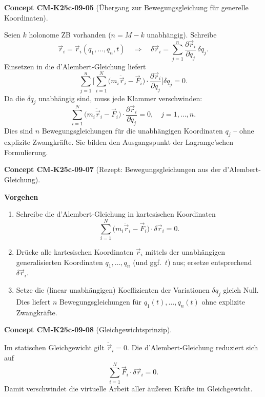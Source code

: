 \documentclass[10pt, letterpaper]{article}
\newcommand{\CustomHeading}[3]{%
  \par\medskip\noindent%
  \textbf{#1 #2} \textnormal{(#3)}.\enskip%
}
\newenvironment{CONC}[2]{\CustomHeading{Concept}{#1}{#2}}{}
\begin{document}
\begin{CONC}{CM-K25c-09-05}{Übergang zur Bewegungsgleichung für generelle Koordinaten}
Seien $k$ holonome ZB vorhanden ($n=M-k$ unabhängig).  
Schreibe
\[
  \vec r_i = \vec r_i(q_1,\dots,q_n,t)
  \quad\Longrightarrow\quad
  \delta\vec r_i = \sum_{j=1}^{n}
                   \frac{\partial\vec r_i}{\partial q_j}\,\delta q_j .
\]
Einsetzen in die d’Alembert-Gleichung liefert
\[
  \sum_{j=1}^{n}\!
  \Biggl[
    \sum_{i=1}^{N}
      \bigl(m_i\ddot{\vec r}_i - \vec F_i\bigr)
      \!\cdot\!
      \frac{\partial\vec r_i}{\partial q_j}
  \Biggr]\!
  \delta q_j = 0 .
\]
Da die $\delta q_j$ unabhängig sind, muss jede Klammer verschwinden:
\[
  \boxed{\;
    \sum_{i=1}^{N}\!
      \bigl(m_i\ddot{\vec r}_i - \vec F_i\bigr)
      \!\cdot\!
      \frac{\partial\vec r_i}{\partial q_j}
    = 0,
    \quad j=1,\dots,n.
  \;}
\]
Dies sind $n$ Bewegungsgleichungen für die unabhängigen Koordinaten 
$q_j$ – ohne explizite Zwangkräfte. Sie bilden den Ausgangspunkt der Lagrange’schen Formulierung.
\end{CONC}

\begin{CONC}{CM-K25c-09-07}{Rezept: Bewegungsgleichungen aus der d’Alembert-Gleichung}
\textbf{Vorgehen}\\[-4pt]
\begin{enumerate}
  \item Schreibe die d’Alembert-Gleichung in kartesischen Koordinaten
        \[
          \sum_{i=1}^{N}
            \bigl(m_i\ddot{\vec r}_i-\vec F_i\bigr)\!\cdot\!\delta\vec r_i = 0 .
        \]
  \item Drücke alle kartesischen Koordinaten $\vec r_i$ mittels der
        unabhängigen generalisierten Koordinaten
        $q_1,\dots,q_n$ (und ggf.\ $t$) aus; ersetze entsprechend
        $\delta\vec r_i$.
  \item Setze die (linear unabhängigen) Koeffizienten der Variationen
        $\delta q_j$ gleich Null.  
        Dies liefert $n$ Bewegungsgleichungen für
        $q_1(t),\dots,q_n(t)$ ohne explizite Zwangkräfte.
\end{enumerate}
\end{CONC}

\begin{CONC}{CM-K25c-09-08}{Gleichgewichtsprinzip}
Im statischen Gleichgewicht gilt $\ddot{\vec r}_i=0$. Die d’Alembert-Gleichung reduziert sich auf
\[
  \sum_{i=1}^{N}\vec F_i\!\cdot\!\delta\vec r_i = 0 .
\]
Damit verschwindet die virtuelle Arbeit aller äußeren Kräfte
im Gleichgewicht.
\end{CONC}
\end{document}
